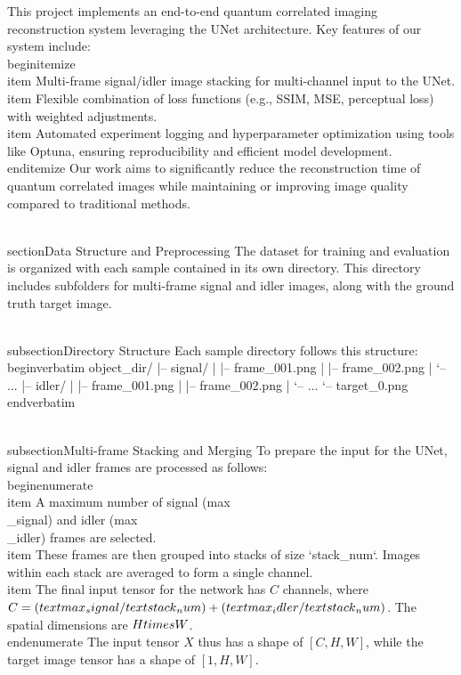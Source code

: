 \documentclass[10pt,journal]{IEEEtran} %
\begin{document}
This project implements an end-to-end quantum correlated imaging reconstruction system leveraging the UNet architecture. Key features of our system include:
\\begin{itemize}
    \\item Multi-frame signal/idler image stacking for multi-channel input to the UNet.
    \\item Flexible combination of loss functions (e.g., SSIM, MSE, perceptual loss) with weighted adjustments.
    \\item Automated experiment logging and hyperparameter optimization using tools like Optuna, ensuring reproducibility and efficient model development.
\\end{itemize}
Our work aims to significantly reduce the reconstruction time of quantum correlated images while maintaining or improving image quality compared to traditional methods.

\\section{Data Structure and Preprocessing}
The dataset for training and evaluation is organized with each sample contained in its own directory. This directory includes subfolders for multi-frame signal and idler images, along with the ground truth target image.

\\subsection{Directory Structure}
Each sample directory follows this structure:
\\begin{verbatim}
object_dir/
|-- signal/       % Contains multi-frame signal images
|   |-- frame_001.png
|   |-- frame_002.png
|   `-- ...
|-- idler/        % Contains multi-frame idler images
|   |-- frame_001.png
|   |-- frame_002.png
|   `-- ...
`-- target_0.png  % Ground truth image
\\end{verbatim}

\\subsection{Multi-frame Stacking and Merging}
To prepare the input for the UNet, signal and idler frames are processed as follows:
\\begin{enumerate}
    \\item A maximum number of signal (max\\_signal) and idler (max\\_idler) frames are selected.
    \\item These frames are then grouped into stacks of size `stack_num`. Images within each stack are averaged to form a single channel.
    \\item The final input tensor for the network has $C$ channels, where $C = (\\text{max\\_signal} / \\text{stack\\_num}) + (\\text{max\\_idler} / \\text{stack\\_num})$. The spatial dimensions are $H \\times W$.
\\end{enumerate}
The input tensor $X$ thus has a shape of $[C, H, W]$, while the target image tensor has a shape of $[1, H, W]$.
\end{document}
